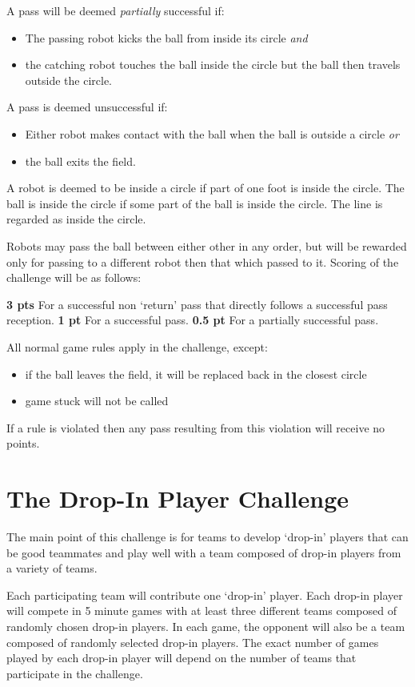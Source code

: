 \documentclass{article}
\begin{document}
A pass will be deemed \emph{partially} successful if:
\begin{itemize}
\item The passing robot kicks the ball from inside its circle \emph{and}
\item the catching robot touches the ball inside the circle but the ball then travels outside the circle.
\end{itemize}

A pass is deemed unsuccessful if:
\begin{itemize}
\item Either robot makes contact with the ball when the ball is outside a circle \emph{or}
\item the ball exits the field.
\end{itemize}

A robot is deemed to be inside a circle if part of one foot is inside the circle. The ball is
inside the circle if some part of the ball is inside the circle. The line is regarded as inside the circle.

Robots may pass the ball between either other in any order, but will be rewarded only for passing
to a different robot then that which passed to it. Scoring of the challenge will be as
follows:

\textbf{3 pts} For a successful non `return' pass that directly follows a successful pass reception.
\textbf{1 pt} For a successful pass.
\textbf{0.5 pt} For a partially successful pass.

All normal game rules apply in the challenge, except:
\begin{itemize}
\item if the ball leaves the field, it will be replaced back in the closest circle
\item game stuck will not be called
\end{itemize}

If a rule is violated then any pass resulting from this violation will receive no points.


\section{The Drop-In Player Challenge}
\label{sec:dropIn}
The main point of this challenge is for teams to develop `drop-in' players that can be good teammates and play well with a team composed of drop-in players from a variety of teams.

Each participating team will contribute one `drop-in' player.  Each drop-in player will compete in 5 minute games with at least three different teams composed of randomly chosen drop-in players.  In each game, the opponent will also be a team composed of randomly selected drop-in players.  The exact number of games played by each drop-in player will depend on the number of teams that participate in the challenge.
\end{document}
